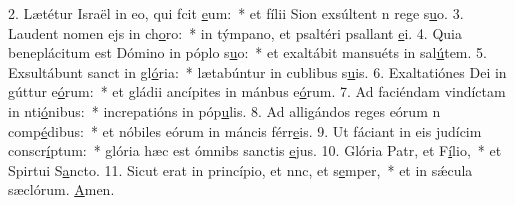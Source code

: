 2. Lætétur Israël in eo, qui fcit \uline{e}um:~* et fílii Sion exsúltent n rege s\uline{u}o.
3. Laudent nomen ejs in ch\uline{o}ro:~* in týmpano, et psaltéri psallant \uline{e}i.
4. Quia beneplácitum est Dómino in póplo s\uline{u}o:~* et exaltábit mansuéts in sal\uline{ú}tem.
5. Exsultábunt sanct in gl\uline{ó}ria:~* lætabúntur in cublibus s\uline{u}is.
6. Exaltatiónes Dei in gúttur e\uline{ó}rum:~* et gládii ancípites in mánbus e\uline{ó}rum.
7. Ad faciéndam vindíctam in nti\uline{ó}nibus:~* increpatións in póp\uline{u}lis.
8. Ad alligándos reges eórum n comp\uline{é}dibus:~* et nóbiles eórum in máncis férr\uline{e}is.
9. Ut fáciant in eis judícim conscr\uline{í}ptum:~* glória hæc est ómnibs sanctis \uline{e}jus.
10. Glória Patr, et F\uline{í}lio,~* et Spirtui S\uline{a}ncto.
11. Sicut erat in princípio, et nnc, et s\uline{e}mper,~* et in sǽcula sæclórum. \uline{A}men.
